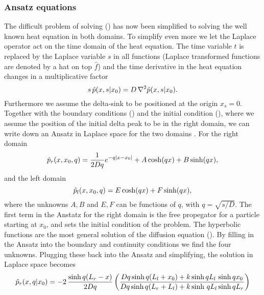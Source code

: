 \subsubsection{Ansatz equations}

The difficult problem of solving () has now been simplified to solving the well known heat equation in both domains. To simplify even more we let the Laplace operator act on the time domain of the heat equation. The time variable $t$ is replaced by the Laplace variable $s$ in all functions (Laplace transformed functions are denoted by a hat on top $\hat{f}$) and the time derivative in the heat equation changes in a multiplicative factor
\begin{equation}
 s \, \hat{p}(x,s|x_0) = D \, \nabla^2 \hat{p}(x,s|x_0).
 \elabel{LDEQ}
\end{equation}
Furthermore we assume the delta-sink to be positioned at the origin $x_s=0$. Together with the boundary conditions () and the initial condition (), where we assume the position of the initial delta peak to be in the right domain, we can write down an Ansatz in Laplace space for the two domains \cite{Carslaw1959}. For the right domain
\begin{equation}
 \hat{p}_r(x,x_0,q) = \frac{1}{2 D q} e^{-q |x-x_0|} + A \, \mathrm{cosh} (q x) + B \, \mathrm{sinh} (q x),
 \elabel{Anz_R}
\end{equation}
and the left domain
\begin{equation}
 \hat{p}_l(x,x_0,q) = E \, \mathrm{cosh} (q x) + F \, \mathrm{sinh} (q x),
\elabel{Anz_L}
\end{equation}
where the unknowns $A,B$ and $E,F$ can be functions of $q$, with $q=\sqrt{s/D}$. The first term in the Anstatz for the right domain is the free propegator for a particle starting at $x_0$, and sets the initial condition of the problem. The hyperbolic functions are the most general solution of the diffusion equation (). By filling in the Ansatz into the boundary and continuity conditions we find the four unknowns. Plugging these back into the Ansatz and simplifying, the solution in Laplace space becomes
\begin{equation}
 \hat{p}_r(x,q|x_0) = -2 \, \frac{\mathrm{sinh} \, q(L_r - x)}{2 D q} \left( \frac{Dq \, \mathrm{sinh} \, q(L_l + x_0) + k \, \mathrm{sinh} \, q L_l \,\, \mathrm{sinh} \, q x_0}{Dq \, \mathrm{sinh} \, q(L_r + L_l) + k \, \mathrm{sinh} \,\, q L_l \, \mathrm{sinh} \, q L_r} \right)
 \elabel{SOL_R}
\end{equation}

